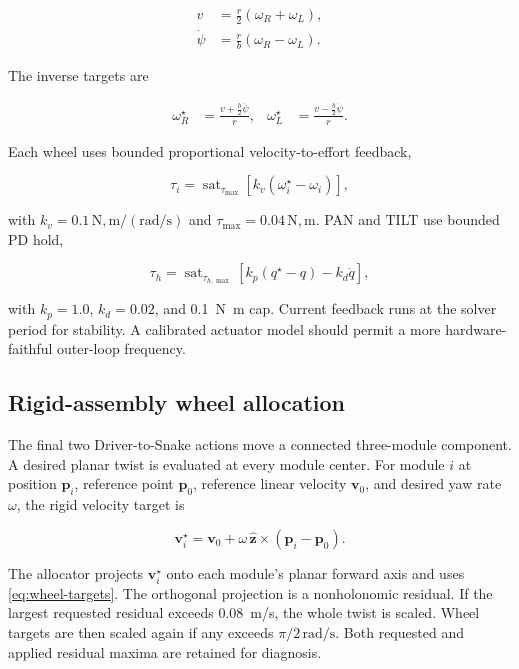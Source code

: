 \begin{align}
v &= \frac{r}{2}(\omega_R+\omega_L), \\
\dot\psi &= \frac{r}{b}(\omega_R-\omega_L).
\label{eq:diff-drive}
\end{align}

The inverse targets are

\begin{align}
\omega_R^\star &= \frac{v+\frac{b}{2}\dot\psi}{r}, &
\omega_L^\star &= \frac{v-\frac{b}{2}\dot\psi}{r}.
\label{eq:wheel-targets}
\end{align}

Each wheel uses bounded proportional velocity-to-effort feedback,

\begin{equation}
\tau_i = \operatorname{sat}_{\tau_{\max}}
\left[k_v(\omega_i^\star-\omega_i)\right],
\label{eq:wheel-effort}
\end{equation}

with $k_v=0.1\,\mathrm{N,m/(rad/s)}$\simchoice{} and
$\tau_{\max}=0.04\,\mathrm{N,m}$\simchoice{}. PAN and TILT use bounded PD hold,

\begin{equation}
\tau_h = \operatorname{sat}_{\tau_{h,\max}}
\left[k_p(q^\star-q)-k_d\dot q\right],
\label{eq:hold-effort}
\end{equation}

with $k_p=1.0$, $k_d=0.02$, and \SI{0.1}{N.m} cap\simchoice{}. Current feedback runs at
the solver period for stability. A calibrated actuator model should permit a more
hardware-faithful outer-loop frequency.

\subsection{Rigid-assembly wheel allocation}

The final two Driver-to-Snake actions move a connected three-module component. A
desired planar twist is evaluated at every module center. For module $i$ at position
$\mathbf p_i$, reference point $\mathbf p_0$, reference linear velocity $\mathbf v_0$,
and desired yaw rate $\omega$, the rigid velocity target is

\begin{equation}
\mathbf v_i^\star = \mathbf v_0 +
\omega\,\hat{\mathbf z}\times(\mathbf p_i-\mathbf p_0).
\label{eq:rigid-velocity}
\end{equation}

The allocator projects $\mathbf v_i^\star$ onto each module's planar forward axis and
uses \cref{eq:wheel-targets}. The orthogonal projection is a nonholonomic residual. If
the largest requested residual exceeds \SI{0.08}{m/s}\simchoice{}, the whole twist is
scaled. Wheel targets are then scaled again if any exceeds $\pi/2\,\mathrm{rad/s}$.
Both requested and applied residual maxima are retained for diagnosis.

